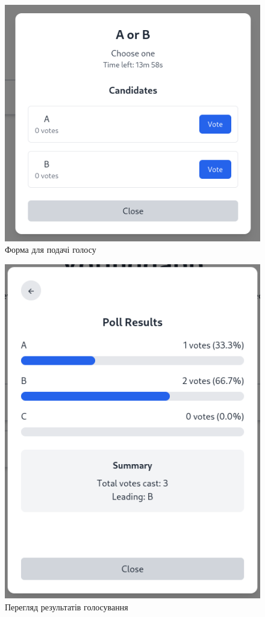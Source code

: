 \documentclass[14pt]{extreport}
\begin{document}
  \begin{figure}[H]
    \centering
    \includegraphics[scale=0.5]{UIVote}
    \caption{Форма для подачі голосу}
    \label{fig:UIVote}
  \end{figure}
  
  \begin{figure}[H]
    \centering
    \includegraphics[scale=0.5]{UIResults}
    \caption{Перегляд результатів голосування}
    \label{fig:UIResults}
  \end{figure}
  
\end{document}
